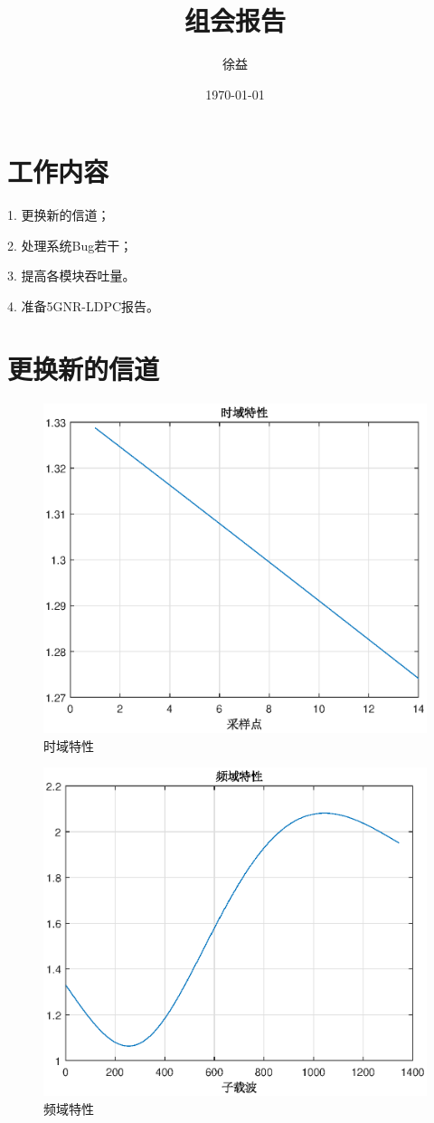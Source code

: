 \documentclass{article}
\title{组会报告}
\author{徐益}
\date{\today}
\begin{document}
\maketitle


\section{工作内容}
1. 更换新的信道；

2. 处理系统Bug若干；

3. 提高各模块吞吐量。

4. 准备5GNR-LDPC报告。

\section{更换新的信道}
\begin{figure}[H]
	\centering
	\includegraphics[width = .8\textwidth]{time.eps}
	\caption{时域特性}
\end{figure}
\begin{figure}[H]
	\centering
	\includegraphics[width = .8\textwidth]{freq.eps}
	\caption{频域特性}
\end{figure}
\end{document}
